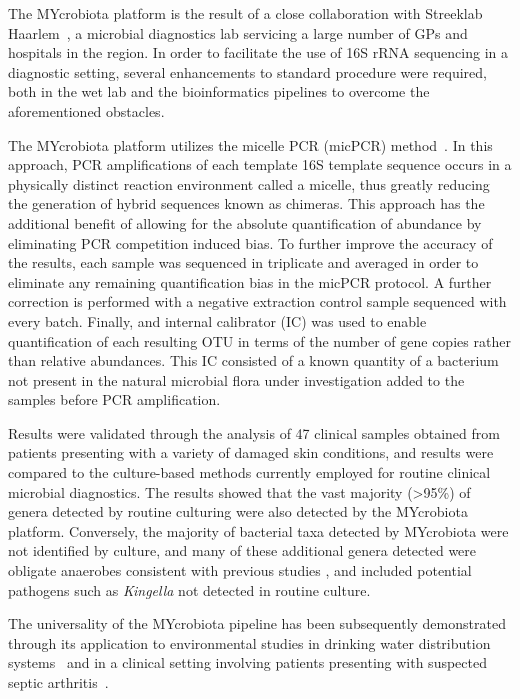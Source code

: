 The MYcrobiota platform is the result of a close collaboration with Streeklab Haarlem~\cite{TODO}, a microbial diagnostics lab servicing a large number of GPs and hospitals in the region. In order to facilitate the use of 16S rRNA sequencing in a diagnostic setting, several enhancements to standard procedure were required, both in the wet lab and the bioinformatics pipelines to overcome the aforementioned obstacles.

The MYcrobiota platform utilizes the micelle PCR (micPCR) method~\cite{boers2015micelle,boers2017novel}. In this approach, PCR amplifications of each template 16S template sequence occurs in a physically distinct reaction environment called a micelle, thus greatly reducing the generation of hybrid sequences known as chimeras. This approach has the additional benefit of allowing for the absolute quantification of abundance by eliminating PCR competition induced bias. To further improve the accuracy of the results, each sample was sequenced in triplicate and averaged in order to eliminate any remaining quantification bias in the micPCR protocol. A further correction is performed with a negative extraction control sample sequenced with every batch. Finally, and internal calibrator (IC) was used to enable quantification of each resulting OTU in terms of the number of gene copies rather than relative abundances. This IC consisted of a known quantity of a bacterium not present in the natural microbial flora under investigation added to the samples before PCR amplification.

Results were validated through the analysis of 47 clinical samples obtained from patients presenting with a variety of damaged skin conditions, and results were compared to the culture-based methods currently employed for routine clinical microbial diagnostics. The results showed that the vast majority (>95\%) of genera detected by routine culturing were also detected by the MYcrobiota platform. Conversely, the majority of bacterial taxa detected by MYcrobiota were not identified by culture, and many of these additional genera detected were obligate anaerobes consistent with previous studies \cite{TODO}, and included potential pathogens such as \emph{Kingella} not detected in routine culture.

The universality of the MYcrobiota pipeline has been subsequently demonstrated through its application to environmental studies in drinking water distribution systems~\cite{boers2018monitoring} and in a clinical setting involving patients presenting with suspected septic arthritis~\cite{boers2018detection}.

